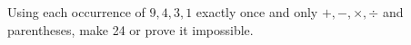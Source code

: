 Using each occurrence of $9,4,3,1$ exactly once and only $+,-,\times,\div$ and parentheses, make 24 or prove it impossible.
